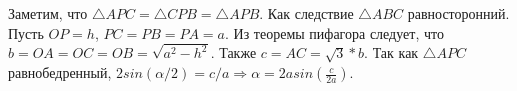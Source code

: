 Заметим, что $\triangle APC = \triangle CPB = \triangle APB$. Как следствие $\triangle ABC$ равносторонний. Пусть $OP=h$, $PC=PB=PA=a$. Из теоремы пифагора следует, что $b=OA=OC=OB=\sqrt{a^2-h^2}$. Также $c=AC=\sqrt{3}*b$. Так как $\triangle APC$ равнобедренный, $2sin(\alpha/2)=c/a \Rightarrow \alpha=2asin(\frac{c}{2a})$.
